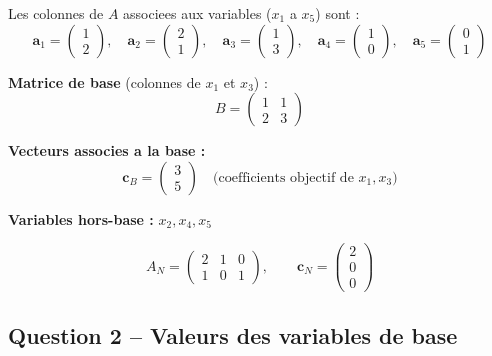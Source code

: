 \documentclass[12pt,a4paper]{article}
\begin{document}
\begin{correction}
Les colonnes de $A$ associees aux variables ($x_1$ a $x_5$) sont :
$$\mathbf{a}_1 = \begin{pmatrix}1\\2\end{pmatrix},\quad
\mathbf{a}_2 = \begin{pmatrix}2\\1\end{pmatrix},\quad
\mathbf{a}_3 = \begin{pmatrix}1\\3\end{pmatrix},\quad
\mathbf{a}_4 = \begin{pmatrix}1\\0\end{pmatrix},\quad
\mathbf{a}_5 = \begin{pmatrix}0\\1\end{pmatrix}$$

\textbf{Matrice de base} (colonnes de $x_1$ et $x_3$) :
$$B = \begin{pmatrix}1 & 1\\2 & 3\end{pmatrix}$$

\textbf{Vecteurs associes a la base :}
$$\mathbf{c}_B = \begin{pmatrix}3\\5\end{pmatrix} \quad \text{(coefficients objectif de } x_1, x_3\text{)}$$

\textbf{Variables hors-base :} $x_2, x_4, x_5$

$$A_N = \begin{pmatrix}2 & 1 & 0\\1 & 0 & 1\end{pmatrix}, \qquad \mathbf{c}_N = \begin{pmatrix}2\\0\\0\end{pmatrix}$$
\end{correction}

\subsection{Question 2 -- Valeurs des variables de base}
\end{document}
